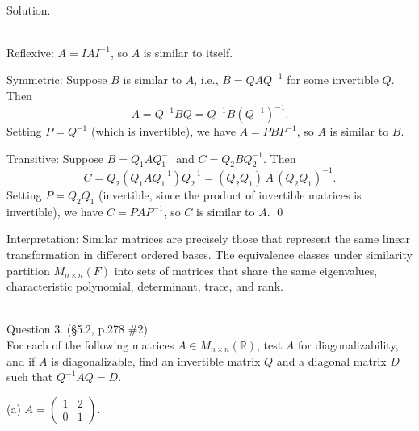 \documentclass{article}
\begin{document}
\noindent\\
\textnormal{Solution.}\\
\quad\\
\begin{mdframed}[linewidth=1pt]
\textnormal{Reflexive:} $A = IAI^{-1}$, so $A$ is similar to itself.

\medskip
\textnormal{Symmetric:} Suppose $B$ is similar to $A$, i.e., $B = QAQ^{-1}$ for some invertible $Q$. Then
\[
A = Q^{-1}BQ = Q^{-1}B(Q^{-1})^{-1}.
\]
Setting $P = Q^{-1}$ (which is invertible), we have $A = PBP^{-1}$, so $A$ is similar to $B$.

\medskip
\textnormal{Transitive:} Suppose $B = Q_1 A Q_1^{-1}$ and $C = Q_2 B Q_2^{-1}$. Then
\[
C = Q_2(Q_1 A Q_1^{-1})Q_2^{-1} = (Q_2 Q_1)\, A\, (Q_2 Q_1)^{-1}.
\]
Setting $P = Q_2 Q_1$ (invertible, since the product of invertible matrices is invertible), we have $C = PAP^{-1}$, so $C$ is similar to $A$. \qed

\medskip
\textnormal{Interpretation:} Similar matrices are precisely those that represent the same linear transformation in different ordered bases. The equivalence classes under similarity partition $M_{n\times n}(F)$ into sets of matrices that share the same eigenvalues, characteristic polynomial, determinant, trace, and rank.
\end{mdframed}

\bigskip

\newpage


\hfill \break  $~\!\!$ \dotfill \medskip \\
\textnormal{Question 3.} (\S5.2, p.278 \#2)\\
For each of the following matrices $A \in M_{n \times n}(\mathbb{R})$, test $A$ for diagonalizability, and if $A$ is diagonalizable, find an invertible matrix $Q$ and a diagonal matrix $D$ such that $Q^{-1}AQ = D$.

\bigskip

\noindent\textnormal{(a)}
$A = \begin{pmatrix} 1 & 2 \\ 0 & 1 \end{pmatrix}$.
\end{document}
